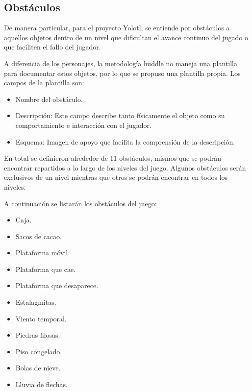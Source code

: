\subsection{Obstáculos}
De manera particular, para el proyecto Yolotl, se entiende por obstáculos a aquellos objetos dentro de un nivel que dificultan el avance continuo del jugado o que faciliten el fallo del jugador.
\\
\par
A diferencia de los personajes, la metodología huddle no maneja una plantilla para documentar estos objetos, por lo que se propuso una plantilla propia. Los campos de la plantilla son:
	\begin{itemize}
		\item Nombre del obstáculo.
		\item Descripción: Este campo describe tanto físicamente el objeto como su comportamiento e interacción con el jugador. 
		\item Esquema: Imagen de apoyo que facilita la comprensión de la descripción. 
	\end{itemize}
En total se definieron alrededor de 11 obstáculos, mismos que se podrán encontrar repartidos a lo largo de los niveles del juego. Algunos obstáculos serán exclusivos de un nivel mientras que otros se podrán encontrar en todos los niveles.
 \\
 \par
 A continuación se listarán los obstáculos del juego:
 	\begin{itemize}
 		\item Caja.
 		\item Sacos de cacao.
 		\item Plataforma móvil.
 		\item Plataforma que cae.
 		\item Plataforma que desaparece.
 		\item Estalagmitas.
 		\item Viento temporal.
 		\item Piedras filosas.
 		\item Piso congelado.
 		\item Bolas de nieve.
 		\item Lluvia de flechas.
 	\end{itemize}
